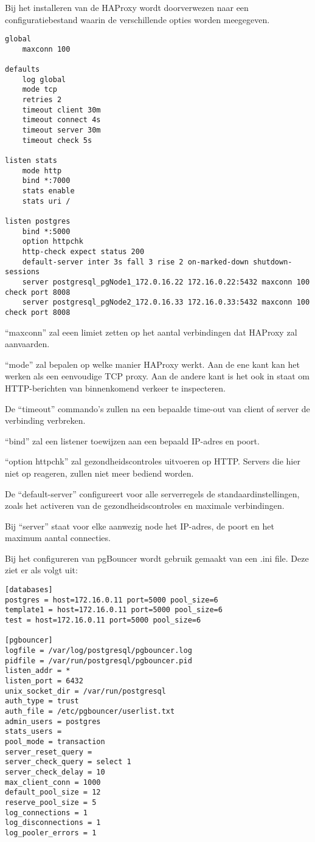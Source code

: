
Bij het installeren van de HAProxy wordt doorverwezen naar een configuratiebestand waarin de verschillende opties worden meegegeven.

\begin{lstlisting}
global
    maxconn 100

defaults
    log global
    mode tcp
    retries 2
    timeout client 30m
    timeout connect 4s
    timeout server 30m
    timeout check 5s

listen stats
    mode http
    bind *:7000
    stats enable
    stats uri /

listen postgres
    bind *:5000
    option httpchk
    http-check expect status 200
    default-server inter 3s fall 3 rise 2 on-marked-down shutdown-sessions
    server postgresql_pgNode1_172.0.16.22 172.16.0.22:5432 maxconn 100 check port 8008
    server postgresql_pgNode2_172.0.16.33 172.16.0.33:5432 maxconn 100 check port 8008
\end{lstlisting}

“maxconn” zal eeen limiet zetten op het aantal verbindingen dat HAProxy zal aanvaarden.

“mode” zal bepalen op welke manier HAProxy werkt. Aan de ene kant kan het werken als een eenvoudige TCP proxy. Aan de andere kant is het ook in staat om HTTP-berichten van binnenkomend verkeer te inspecteren.

De “timeout” commando's zullen na een bepaalde time-out van client of server de verbinding verbreken.

“bind” zal een listener toewijzen aan een bepaald IP-adres en poort.

“option httpchk” zal gezondheidscontroles uitvoeren op HTTP. Servers die hier niet op reageren, zullen niet meer bediend worden.

De “default-server” configureert voor alle serverregels de standaardinstellingen, zoals het activeren van de gezondheidscontroles en maximale verbindingen.

Bij “server” staat voor elke aanwezig node het IP-adres, de poort en het maximum aantal connecties.

Bij het configureren van pgBouncer wordt gebruik gemaakt van een .ini file. Deze ziet er als volgt uit:

\begin{lstlisting}
[databases]
postgres = host=172.16.0.11 port=5000 pool_size=6
template1 = host=172.16.0.11 port=5000 pool_size=6
test = host=172.16.0.11 port=5000 pool_size=6

[pgbouncer]
logfile = /var/log/postgresql/pgbouncer.log
pidfile = /var/run/postgresql/pgbouncer.pid
listen_addr = *
listen_port = 6432
unix_socket_dir = /var/run/postgresql
auth_type = trust
auth_file = /etc/pgbouncer/userlist.txt
admin_users = postgres
stats_users =
pool_mode = transaction
server_reset_query =
server_check_query = select 1
server_check_delay = 10
max_client_conn = 1000
default_pool_size = 12
reserve_pool_size = 5
log_connections = 1
log_disconnections = 1
log_pooler_errors = 1  
\end{lstlisting}

